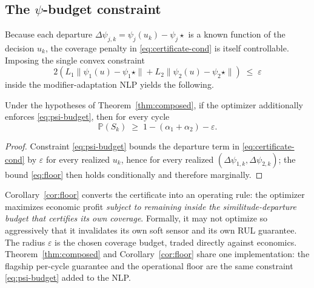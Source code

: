 \subsection{The $\psi$-budget constraint}
\label{sec:budget}

Because each departure $\Delta\psi_{j,k} = \psi_j(u_k) - \psi_j\!\star$ is a known
function of the decision $u_k$, the coverage penalty in
\eqref{eq:certificate-cond} is itself controllable. Imposing the single convex
constraint
\begin{equation}
2\!\left(L_1\|\psi_1(u) - \psi_1\!\star\| + L_2\|\psi_2(u) - \psi_2\!\star\|\right) \;\le\; \varepsilon
\label{eq:psi-budget}
\end{equation}
inside the modifier-adaptation NLP yields the following.

\begin{corollary}
\label{cor:floor}
Under the hypotheses of Theorem~\ref{thm:composed}, if the optimizer additionally
enforces \eqref{eq:psi-budget}, then for every cycle
\begin{equation}
\mathbb{P}(S_k) \;\ge\; 1 - (\alpha_1 + \alpha_2) - \varepsilon.
\label{eq:floor}
\end{equation}
\end{corollary}

\begin{proof}
Constraint \eqref{eq:psi-budget} bounds the departure term in
\eqref{eq:certificate-cond} by $\varepsilon$ for every realized $u_k$, hence for
every realized $(\Delta\psi_{1,k},\Delta\psi_{2,k})$; the bound
\eqref{eq:floor} then holds conditionally and therefore marginally.
\end{proof}

Corollary~\ref{cor:floor} converts the certificate into an operating rule: the
optimizer maximizes economic profit \emph{subject to remaining inside the
similitude-departure budget that certifies its own coverage}. Formally, it may
not optimize so aggressively that it invalidates its own soft sensor and its own
RUL guarantee. The radius $\varepsilon$ is the chosen coverage budget, traded
directly against economics. Theorem~\ref{thm:composed} and
Corollary~\ref{cor:floor} share one implementation: the flagship per-cycle
guarantee and the operational floor are the same constraint
\eqref{eq:psi-budget} added to the NLP.
